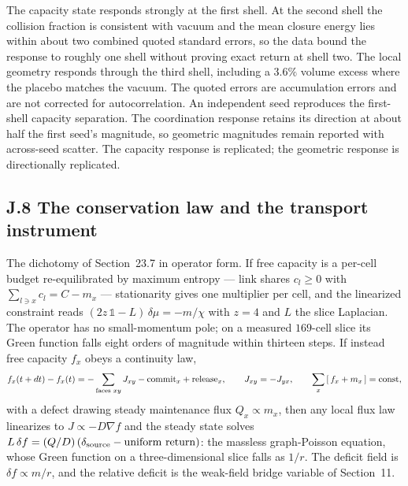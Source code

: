 \documentclass[11pt]{article}
\begin{document}
The capacity state responds strongly at the first shell. At the second shell the collision fraction is consistent with vacuum and the mean closure energy lies within about two combined quoted standard errors, so the data bound the response to roughly one shell without proving exact return at shell two. The local geometry responds through the third shell, including a $3.6\%$ volume excess where the placebo matches the vacuum. The quoted errors are accumulation errors and are not corrected for autocorrelation. An independent seed reproduces the first-shell capacity separation. The coordination response retains its direction at about half the first seed's magnitude, so geometric magnitudes remain reported with across-seed scatter. The capacity response is replicated; the geometric response is directionally replicated.

\subsection*{J.8 The conservation law and the transport instrument}

The dichotomy of Section~23.7 in operator form. If free capacity is a per-cell budget re-equilibrated by maximum entropy --- link shares $c_l\ge0$ with $\sum_{l\ni x}c_l=C-m_x$ --- stationarity gives one multiplier per cell, and the linearized constraint reads $(2z\,\mathbb{1}-L)\,\delta\mu=-m/\chi$ with $z=4$ and $L$ the slice Laplacian. The operator has no small-momentum pole; on a measured $169$-cell slice its Green function falls eight orders of magnitude within thirteen steps. If instead free capacity $f_x$ obeys a continuity law,
\[
f_x(t+dt)-f_x(t)=-\sum_{\text{faces }xy}J_{xy}-{\rm commit}_x+{\rm release}_x,
\qquad J_{xy}=-J_{yx},
\qquad \sum_x\,[\,f_x+m_x\,]={\rm const},
\]
with a defect drawing steady maintenance flux $Q_x\propto m_x$, then any local flux law linearizes to $J\propto-D\nabla f$ and the steady state solves $L\,\delta f=(Q/D)\,(\delta_{\rm source}-{\rm uniform\ return})$: the massless graph-Poisson equation, whose Green function on a three-dimensional slice falls as $1/r$. The deficit field is $\delta f\propto m/r$, and the relative deficit is the weak-field bridge variable of Section~11.
\end{document}
